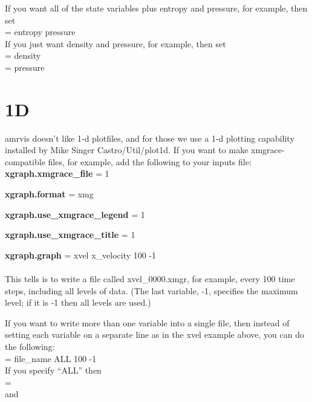 \noindent If you want all of the state variables plus entropy and pressure, for example, then set \\

 = entropy pressure \\

\noindent If you just want density and pressure, for example, then set \\

 =  density \\

 = pressure \\

\section{1D}
amrvis doesn't like 1-d plotfiles, and for those we use a 1-d plotting capability installed by Mike Singer 
Castro/Util/plot1d.  If you want to make xmgrace-compatible files, for example, add the following to your inputs file:\\

{\bf xgraph.xmgrace\_file} = 1

{\bf xgraph.format} = xmg

{\bf xgraph.use\_xmgrace\_legend} = 1

{\bf xgraph.use\_xmgrace\_title} = 1

{\bf xgraph.graph} = xvel x\_velocity 100 -1\\ \\
This tells is to write a file called xvel\_0000.xmgr, for example, every 100 time steps, including all levels of data. (The last variable, -1, specifies the maximum level; if it is -1 then all levels are used.)

If you want to write more than one variable into a single file, then instead of
setting each variable on a separate line as in the xvel example above,
you can do the following: \\

 = file\_name ALL 100 -1\\

\noindent If you specify ``ALL'' then \\

 = \\

\noindent and \\

